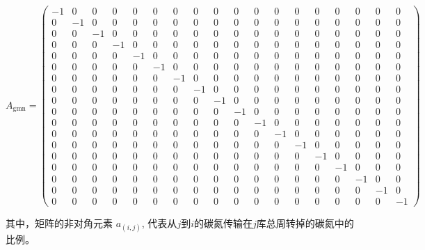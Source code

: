 \begin{landscape}
  \enlargethispage{55pt}
  \begin{equation}
    A_{\mathrm{gmn}}=\left(\begin{array}{rrrrrrrrrrrrrrrrrrrrrrrrrrrrrr}
        -1 & 0 & 0 & 0 & 0 & 0 & 0 & 0 & 0 & 0 & 0 & 0 & 0 & 0 & 0 & 0 & 0 & 0 \\
        0 & -1 & 0 & 0 & 0 & 0 & 0 & 0 & 0 & 0 & 0 & 0 & 0 & 0 & 0 & 0 & 0 & 0 \\
        0 & 0 & -1 & 0 & 0 & 0 & 0 & 0 & 0 & 0 & 0 & 0 & 0 & 0 & 0 & 0 & 0 & 0 \\
        0 & 0 & 0 & -1 & 0 & 0 & 0 & 0 & 0 & 0 & 0 & 0 & 0 & 0 & 0 & 0 & 0 & 0 \\
        0 & 0 & 0 & 0 & -1 & 0 & 0 & 0 & 0 & 0 & 0 & 0 & 0 & 0 & 0 & 0 & 0 & 0 \\
        0 & 0 & 0 & 0 & 0 & -1 & 0 & 0 & 0 & 0 & 0 & 0 & 0 & 0 & 0 & 0 & 0 & 0 \\
        0 & 0 & 0 & 0 & 0 & 0 & -1 & 0 & 0 & 0 & 0 & 0 & 0 & 0 & 0 & 0 & 0 & 0 \\
        0 & 0 & 0 & 0 & 0 & 0 & 0 & -1 & 0 & 0 & 0 & 0 & 0 & 0 & 0 & 0 & 0 & 0 \\
        0 & 0 & 0 & 0 & 0 & 0 & 0 & 0 & -1 & 0 & 0 & 0 & 0 & 0 & 0 & 0 & 0 & 0 \\
        0 & 0 & 0 & 0 & 0 & 0 & 0 & 0 & 0 & -1 & 0 & 0 & 0 & 0 & 0 & 0 & 0 & 0 \\
        0 & 0 & 0 & 0 & 0 & 0 & 0 & 0 & 0 & 0 & -1 & 0 & 0 & 0 & 0 & 0 & 0 & 0 \\
        0 & 0 & 0 & 0 & 0 & 0 & 0 & 0 & 0 & 0 & 0 & -1 & 0 & 0 & 0 & 0 & 0 & 0 \\
        0 & 0 & 0 & 0 & 0 & 0 & 0 & 0 & 0 & 0 & 0 & 0 & -1 & 0 & 0 & 0 & 0 & 0 \\
        0 & 0 & 0 & 0 & 0 & 0 & 0 & 0 & 0 & 0 & 0 & 0 & 0 & -1 & 0 & 0 & 0 & 0 \\
        0 & 0 & 0 & 0 & 0 & 0 & 0 & 0 & 0 & 0 & 0 & 0 & 0 & 0 & -1 & 0 & 0 & 0 \\
        0 & 0 & 0 & 0 & 0 & 0 & 0 & 0 & 0 & 0 & 0 & 0 & 0 & 0 & 0 & -1 & 0 & 0 \\
        0 & 0 & 0 & 0 & 0 & 0 & 0 & 0 & 0 & 0 & 0 & 0 & 0 & 0 & 0 & 0 & -1 &0 \\
    0 & 0 & 0 & 0 & 0 & 0 & 0 & 0 & 0 & 0 & 0 & 0 & 0 & 0 & 0 & 0 & 0 & -1\end{array}\right)
  \end{equation}
\end{landscape}
其中，矩阵的非对角元素 $a_{(i,j)}$, 代表从$j$到$i$的碳氮传输在$j$库总周转掉的碳氮中的比例。


